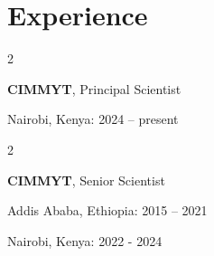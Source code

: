\documentclass[10pt, letterpaper]{article}
\newenvironment{highlights}{
    \begin{itemize}[
        topsep=0.10 cm,
        parsep=0.10 cm,
        partopsep=0pt,
        itemsep=0pt,
        leftmargin=0.4 cm + 10pt
    ]
}{
    \end{itemize}
} %
\newenvironment{twocolentry}[2][]{
    \onecolentry
    \def\secondColumn{#2}
    \setcolumnwidth{\fill, 6.5 cm}
    \begin{paracol}{2}
}{
    \switchcolumn \raggedleft \secondColumn
    \end{paracol}
    \endonecolentry
} %
\let\hrefWithoutArrow\href
\renewcommand{\href}[2]{\hrefWithoutArrow{#1}{\ifthenelse{\equal{#2}{}}{ }{#2 }\raisebox{.15ex}{\footnotesize \faExternalLink*}}}
\begin{document}





    
    \section{Experience}



        
        \begin{twocolentry}{
            Nairobi, Kenya: 2024 – present

            \vspace*{5pt}
        }
            \textbf{CIMMYT}, Principal Scientist
        \end{twocolentry}

        \vspace{0.2 cm}

        \begin{twocolentry}{
            Addis Ababa, Ethiopia: 2015 – 2021
            
            Nairobi, Kenya: 2022 - 2024
        }
            \textbf{CIMMYT}, Senior Scientist
        \end{twocolentry}
\end{document}
